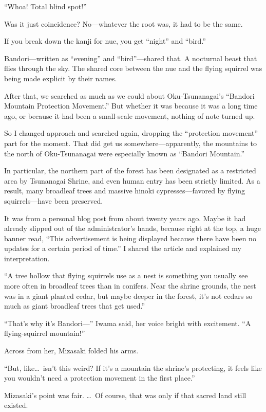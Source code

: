 \documentclass[
    a4paper,
    12pt,
    twoside,
    openany,
    UTF8,
    fontset=windows
]{ctexbook}
\begin{document}
``Whoa! Total blind spot!''

Was it just coincidence? No---whatever the root was, it had to be the same.

If you break down the kanji for nue, you get ``night'' and ``bird.''

Bandori---written as ``evening'' and ``bird''---shared that. A nocturnal beast that flies through the sky. The shared core between the nue and the flying squirrel was being made explicit by their names.

After that, we searched as much as we could about Oku-Tsunanagai's ``Bandori Mountain Protection Movement.'' But whether it was because it was a long time ago, or because it had been a small-scale movement, nothing of note turned up.

So I changed approach and searched again, dropping the ``protection movement'' part for the moment. That did get us somewhere---apparently, the mountains to the north of Oku-Tsunanagai were especially known as ``Bandori Mountain.''

In particular, the northern part of the forest has been designated as a restricted area by Tsunanagai Shrine, and even human entry has been strictly limited. As a result, many broadleaf trees and massive hinoki cypresses---favored by flying squirrels---have been preserved.

It was from a personal blog post from about twenty years ago. Maybe it had already slipped out of the administrator's hands, because right at the top, a huge banner read, ``This advertisement is being displayed because there have been no updates for a certain period of time.'' I shared the article and explained my interpretation.

``A tree hollow that flying squirrels use as a nest is something you usually see more often in broadleaf trees than in conifers. Near the shrine grounds, the nest was in a giant planted cedar, but maybe deeper in the forest, it's not cedars so much as giant broadleaf trees that get used.''

``That's why it's Bandori---'' Iwama said, her voice bright with excitement. ``A flying-squirrel mountain!''

Across from her, Mizasaki folded his arms.

``But, like\dots\ isn't this weird? If it's a mountain the shrine's protecting, it feels like you wouldn't need a protection movement in the first place.''

Mizasaki's point was fair. \dots\ Of course, that was only if that sacred land still existed.
\end{document}
